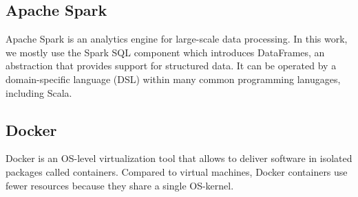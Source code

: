 \subsection{Apache Spark}
Apache Spark is an analytics engine for large-scale data processing.
In this work, we mostly use the Spark SQL component which introduces DataFrames, an abstraction that provides support for structured data.
It can be operated by a domain-specific language (DSL) within many common programming lanugages, including Scala.

\subsection{Docker}
Docker is an OS-level virtualization tool that allows to deliver software in isolated packages called containers.
Compared to virtual machines, Docker containers use fewer resources because they share a single OS-kernel.
